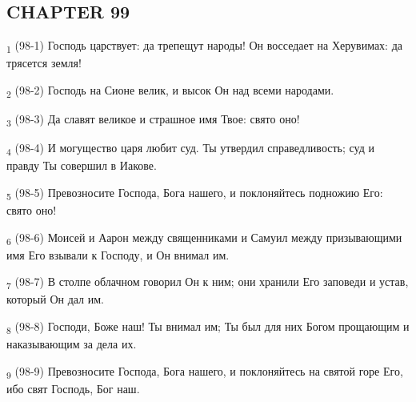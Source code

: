 \subsection{CHAPTER 99}
\begin{tcolorbox}
\textsubscript{1} (98-1) Господь царствует: да трепещут народы! Он восседает на Херувимах: да трясется земля!
\end{tcolorbox}
\begin{tcolorbox}
\textsubscript{2} (98-2) Господь на Сионе велик, и высок Он над всеми народами.
\end{tcolorbox}
\begin{tcolorbox}
\textsubscript{3} (98-3) Да славят великое и страшное имя Твое: свято оно!
\end{tcolorbox}
\begin{tcolorbox}
\textsubscript{4} (98-4) И могущество царя любит суд. Ты утвердил справедливость; суд и правду Ты совершил в Иакове.
\end{tcolorbox}
\begin{tcolorbox}
\textsubscript{5} (98-5) Превозносите Господа, Бога нашего, и поклоняйтесь подножию Его: свято оно!
\end{tcolorbox}
\begin{tcolorbox}
\textsubscript{6} (98-6) Моисей и Аарон между священниками и Самуил между призывающими имя Его взывали к Господу, и Он внимал им.
\end{tcolorbox}
\begin{tcolorbox}
\textsubscript{7} (98-7) В столпе облачном говорил Он к ним; они хранили Его заповеди и устав, который Он дал им.
\end{tcolorbox}
\begin{tcolorbox}
\textsubscript{8} (98-8) Господи, Боже наш! Ты внимал им; Ты был для них Богом прощающим и наказывающим за дела их.
\end{tcolorbox}
\begin{tcolorbox}
\textsubscript{9} (98-9) Превозносите Господа, Бога нашего, и поклоняйтесь на святой горе Его, ибо свят Господь, Бог наш.
\end{tcolorbox}
